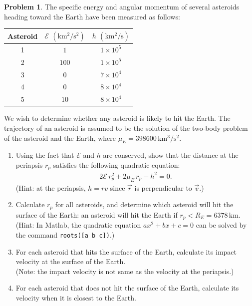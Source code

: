 \documentclass[10pt]{article}
\theoremstyle{definition}
\newtheorem{prob}{Problem}[section]
\newenvironment{subprob}%
{\renewcommand{\theenumi}{\alph{enumi}}\renewcommand{\labelenumi}{(\theenumi)}\begin{enumerate}}%
{\end{enumerate}}%
\begin{document}
\clearpage\newpage
\begin{prob}
The specific energy and angular momentum of several asteroids heading toward the Earth have been measured as follows:

\begin{center}
\begin{tabular}{c|c|c}\hline
Asteroid & $\mathcal{E}$ $(\mathrm{km^2/s^2})$ & $h$ $(\mathrm{km^2/s})$\\ \hline
1 & $1$ & $1\times 10^5$\\
2 & $100$ & $1\times 10^5$\\
3 & $0$ & $7\times 10^4$\\
4 & $0$ & $8\times 10^4$\\
5 & $10$ & $8\times 10^4$\\\hline
\end{tabular}
\end{center}
%
We wish to determine whether any asteroid is likely to hit the Earth. The trajectory of an asteroid is assumed to be the solution of the two-body problem of the asteroid and the Earth, where $\mu_E=398600\,\mathrm{km^3/s^2}$.

\begin{subprob}
\item Using the fact that $\mathcal{E}$ and $h$ are conserved, show that the distance at the periapsis $r_p$ satisfies the following quadratic equation:
\begin{gather}
2\mathcal{E}\, r_p^2 + 2\mu_E\, r_p -h^2=0. 
\end{gather}
(Hint: at the periapsis, $h=rv$ since $\vec r$ is perpendicular to $\vec v$.)
\item Calculate $r_p$ for all asteroids, and determine which asteroid will hit the surface of the Earth: an asteroid will hit the Earth if $r_p < R_E=6378\,\mathrm{km}$.\\
(Hint: In Matlab, the quadratic equation $ax^2+bx+c=0$ can be solved by the command \texttt{roots([a b c])}.)
\item For each asteroid that hits the surface of the Earth, calculate its impact velocity at the surface of the Earth.\\
(Note: the impact velocity is not same as the velocity at the periapsis.)
\item For each asteroid that does not hit the surface of the Earth, calculate its velocity when it is closest to the Earth.
\end{subprob}
\end{prob}
\end{document}
